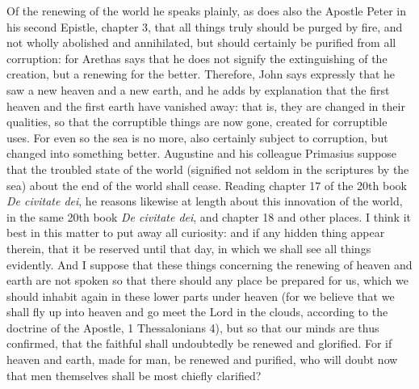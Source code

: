 Of the renewing of the world he speaks plainly, as does also the Apostle Peter in his second Epistle, chapter 3, that all things truly should be purged by fire, and not wholly abolished and annihilated, but should certainly be purified from all corruption: for Arethas says that he does not signify the extinguishing of the creation, but a renewing for the better. Therefore, John says expressly that he saw a new heaven and a new earth, and he adds by explanation that the first heaven and the first earth have vanished away: that is, they are changed in their qualities, so that the corruptible things are now gone, created for corruptible uses. For even so the sea is no more, also certainly subject to corruption, but changed into something better. Augustine and his colleague Primasius suppose that the troubled state of the world (signified not seldom in the scriptures by the sea) about the end of the world shall cease. Reading chapter 17 of the 20th book \textit{De civitate dei}, he reasons likewise at length about this innovation of the world, in the same 20th book \textit{De civitate dei}, and chapter 18 and other places. I think it best in this matter to put away all curiosity: and if any hidden thing appear therein, that it be reserved until that day, in which we shall see all things evidently. And I suppose that these things concerning the renewing of heaven and earth are not spoken so that there should any place be prepared for us, which we should inhabit again in these lower parts under heaven (for we believe that we shall fly up into heaven and go meet the Lord in the clouds, according to the doctrine of the Apostle, 1 Thessalonians 4), but so that our minds are thus confirmed, that the faithful shall undoubtedly be renewed and glorified. For if heaven and earth, made for man, be renewed and purified, who will doubt now that men themselves shall be most chiefly clarified?

